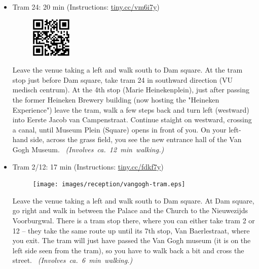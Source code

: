 \begin{itemize}
\clearpage

\item {Tram 24}: \hfill 20 min (Instructions: \url{tiny.cc/vm6i7y})

\begin{minipage}{.9\textwidth}
\begin{figure}
\vspace*{-1.25\baselineskip}%
\includegraphics[width=1.9cm]{images/reception/vangogh-tram-24.png}
\end{figure}
Leave the venue taking a left and walk south to Dam square. At the tram stop just before Dam square, take tram 24 in southward direction (VU medisch centrum). At the 4th stop (Marie Heinekenplein), just after passing the former Heineken Brewery building (now hosting the "Heineken Experience") leave the tram, walk a few steps back and turn left (westward) into Eerste Jacob van Campenstraat. Continue staight on westward, crossing a canal, until Museum Plein (Square) opens in front of you. On your left-hand side, across the grass field, you see the new entrance hall of the Van Gogh Museum.
~\hspace*{\fill}\mbox{\emph{(Involves ca.\ 12 min walking.)}}
\end{minipage}

\item {Tram 2/12}: \hfill 17 min (Instructions: \url{tiny.cc/fdkf7y})

\begin{minipage}{.9\textwidth}
\begin{figure}
\vspace*{-1.25\baselineskip}%
\texttt{[image: images/reception/vangogh-tram.eps]}
\end{figure}
Leave the venue taking a left and walk south to Dam square. At Dam square, go right and walk in between the Palace and the Church to the Nieuwezijds Voorburgwal. There is a tram stop there, where you can either take tram 2 or 12  -- they take the same route up until its 7th stop, Van Baerlestraat, where you exit. The tram will just have passed the Van Gogh museum (it is on the left side seen from the tram), so you have to walk back a bit and cross the street.
~\hspace*{\fill}\mbox{\emph{(Involves ca.\ 6 min walking.)}}
\end{minipage}

\end{itemize}


